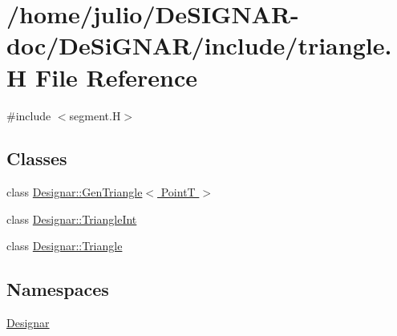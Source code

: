 \hypertarget{triangle_8_h}{}\section{/home/julio/\+De\+S\+I\+G\+N\+A\+R-\/doc/\+De\+Si\+G\+N\+A\+R/include/triangle.H File Reference}
\label{triangle_8_h}
{\ttfamily \#include $<$segment.\+H$>$}\newline
\subsection*{Classes}
\begin{DoxyCompactItemize}
\item 
class \hyperlink{class_designar_1_1_gen_triangle}{Designar\+::\+Gen\+Triangle$<$ Point\+T $>$}
\item 
class \hyperlink{class_designar_1_1_triangle_int}{Designar\+::\+Triangle\+Int}
\item 
class \hyperlink{class_designar_1_1_triangle}{Designar\+::\+Triangle}
\end{DoxyCompactItemize}
\subsection*{Namespaces}
\begin{DoxyCompactItemize}
\item 
 \hyperlink{namespace_designar}{Designar}
\end{DoxyCompactItemize}
